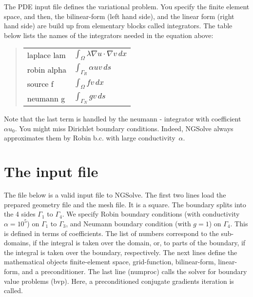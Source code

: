 \documentclass[12pt]{book}
\begin{document}
The PDE input file defines the variational problem. You specify the
finite element space, and then, the bilinear-form (left hand side),
and the linear form (right hand side) are build up from elementary
blocks called integrators. The table below lists the names of the
integrators needed in the equation above:

\begin{quote}
\begin{tabular}{|l|l|}
\hline
laplace lam &  $\int_\Omega \lambda \nabla u \cdot \nabla v \, dx$ \\
robin alpha & $\int_{\Gamma_R} \alpha u v \, ds$ \\
\hline
source f    & $\int_\Omega f v \, dx$ \\
neumann g   & $\int_{\Gamma_N} g v \, ds$ \\
\hline
\end{tabular}
\end{quote}

Note that the last term is handled by the neumann - integrator with
coefficient $\alpha u_0$. You might miss Dirichlet boundary
conditions. Indeed, NGSolve always approximates them by Robin
b.c. with large conductivity~$\alpha$.

\section{The input file}


The file below is a valid input file to NGSolve. The first two lines
load the prepared geometry file and the mesh file. It is a square. The
boundary splits into the 4 sides $\Gamma_1$ to $\Gamma_4$. We specify 
Robin boundary conditions (with conductivity $\alpha = 10^5$) on $\Gamma_1$
to $\Gamma_3$, and Neumann boundary condition (with $g = 1$) on $\Gamma_4$.
This is defined in terms of coefficients. The list of numbers correspond to
the sub-domains, if the integral is taken over the domain, or, to parts
of the boundary, if the integral is taken over the boundary, respectively.
The next lines define the mathematical objects finite-element space, 
grid-function, bilinear-form, linear-form, and a preconditioner. 
The last line (numproc) calls the solver for boundary value problems (bvp). Here,
a preconditioned conjugate gradients iteration is called.
\end{document}
